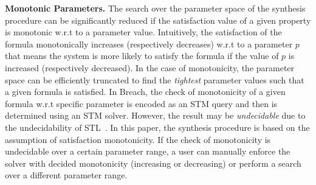 \vspace{0.5em}
\noindent
{\bf Monotonic Parameters.} The search over the parameter space of the synthesis procedure can be significantly reduced if the satisfaction value of a given property is monotonic w.r.t to a parameter value. Intuitively, the satisfaction of the formula monotonically increases (respectively decreases) w.r.t to a parameter $p$ that means the system is more likely to satisfy the formula if the value of $p$ is increased (respectively decreased). In the case of monotonicity, the parameter space can be efficiently truncated to find the \emph{tightest} parameter values such that a given formula is satisfied. In Breach, the check of monotonicity of a given formula w.r.t specific parameter is encoded as an STM query and then is determined using an STM solver. However, the result may be \emph{undecidable} due to the undecidability of STL~\cite{jin2015mining}. 
%
In this paper, the synthesis procedure is based on the assumption of satisfaction monotonicity. If the check of monotonicity is undecidable over a certain parameter range, a user can manually enforce the solver with decided monotonicity (increasing or decreasing) or perform a search over a different parameter range. 

%



%